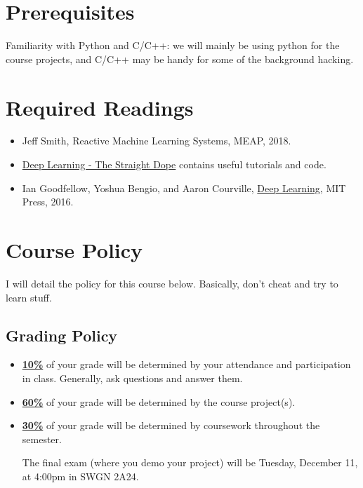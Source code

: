 \documentclass[11pt]{article}
\begin{document}
\section*{Prerequisites}

Familiarity with Python and C/C++: we will mainly be using python for the course projects, and C/C++ may be handy for some of the background hacking.


\section*{Required Readings}

\begin{itemize}
\item Jeff Smith, Reactive Machine Learning Systems, MEAP, 2018.
\item \href{https://gluon.mxnet.io/}{Deep Learning - The Straight Dope} contains useful tutorials and code.
\item Ian Goodfellow, Yoshua Bengio, and Aaron Courville, \href{http://www.deeplearningbook.org/}{Deep Learning}, MIT Press, 2016.
\end{itemize} 


\section*{Course Policy}

I will detail the policy for this course below. Basically, don't cheat and try to learn stuff.

\subsection*{Grading Policy}
\begin{itemize}
  \item \underline{\textbf{10\%}} of your grade will be determined by your attendance and participation in class. Generally, ask questions and answer them.

  \item \underline{\textbf{60\%}} of your grade will be determined by the course project(s). 

  \item \underline{\textbf{30\%}} of your grade will be determined by coursework throughout the semester.

The final exam (where you demo your project) will be Tuesday, December 11, at 4:00pm in SWGN 2A24.

\end{itemize}
\end{document}
